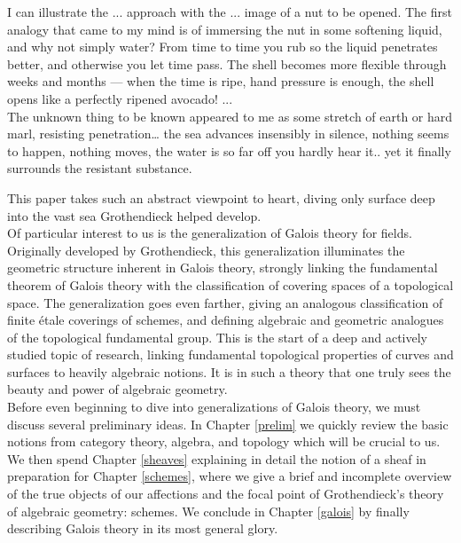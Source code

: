 \documentclass[11pt,openany]{book} %
\begin{document}
\begin{fquote}
I can illustrate the ... approach with the ... image of a nut to be opened. The first analogy that came to my mind is of immersing the nut in some softening liquid, and why not simply water? From time to time you rub so the liquid penetrates better, and otherwise you let time pass. The shell becomes more flexible through weeks and months — when the time is ripe, hand pressure is enough, the shell opens like a perfectly ripened avocado! ...\\

The unknown thing to be known appeared to me as some stretch of earth or hard marl, resisting penetration… the sea advances insensibly in silence, nothing seems to happen, nothing moves, the water is so far off you hardly hear it.. yet it finally surrounds the resistant substance.
\end{fquote}

This paper takes such an abstract viewpoint to heart, diving only surface deep into the vast sea Grothendieck helped develop.\\

Of particular interest to us is the generalization of Galois theory for fields. Originally developed by Grothendieck, this generalization illuminates the geometric structure inherent in Galois theory, strongly linking the fundamental theorem of Galois theory with the classification of covering spaces of a topological space. The generalization goes even farther, giving an analogous classification of finite \'etale coverings of schemes, and defining algebraic and geometric analogues of the topological fundamental group. This is the start of a deep and actively studied topic of research, linking fundamental topological properties of curves and surfaces to heavily algebraic notions. It is in such a theory that one truly sees the beauty and power of algebraic geometry.\\

Before even beginning to dive into generalizations of Galois theory, we must discuss several preliminary ideas. In Chapter \ref{prelim} we quickly review the basic notions from category theory, algebra, and topology which will be crucial to us. We then spend Chapter \ref{sheaves} explaining in detail the notion of a sheaf in preparation for Chapter \ref{schemes}, where we give a brief and incomplete overview of the true objects of our affections and the focal point of Grothendieck's theory of algebraic geometry: schemes. We conclude in Chapter \ref{galois} by finally describing Galois theory in its most general glory.\\
\end{document}
